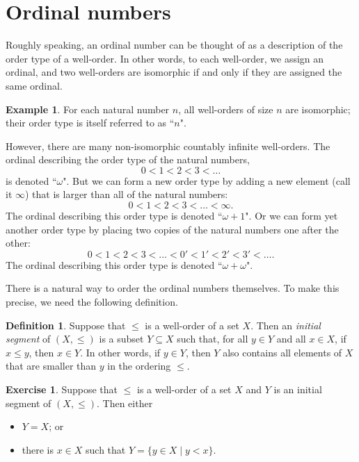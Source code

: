 \documentclass[a4paper]{memoir}
\theoremstyle{definition}
\newtheorem{definition}[theorem]{Definition}
\newtheorem{exercise}[theorem]{Exercise}
\newtheorem{example}[theorem]{Example}
\begin{document}
\section{Ordinal numbers}

Roughly speaking, an ordinal number can be thought of as a description of the order type of a well-order. 
In other words, to each well-order, we assign an ordinal, and two well-orders are isomorphic if and only 
if they are assigned the same ordinal. 

\begin{example}
  For each natural number $n$, all well-orders of size $n$ are isomorphic; their order type is itself 
  referred to as ``$n$". 
  
  However, there are many non-isomorphic countably infinite well-orders. The ordinal describing the 
  order type of the natural numbers,
  \[
    0 < 1 < 2 < 3 < \ldots
  \]  
   is denoted ``$\omega$". But we can form a new order type by adding a new element (call it $\infty$) 
   that is larger than all of the natural numbers:
   \[
     0 < 1 < 2 < 3 < \ldots < \infty.
   \]
   The ordinal describing this order type is denoted ``$\omega + 1$". Or we can form yet another order type 
   by placing two copies of the natural numbers one after the other:
   \[
     0 < 1 < 2 < 3 < \ldots < 0' < 1' < 2' < 3' < \ldots.
   \]
   The ordinal describing this order type is denoted ``$\omega + \omega$".
\end{example}

There is a natural way to order the ordinal numbers themselves. To make this precise, we need the 
following definition.

\begin{definition}
  Suppose that $\leq$ is a well-order of a set $X$. Then an \emph{initial segment} of 
  $(X, \leq)$ is a subset $Y \subseteq X$ such that, for all $y \in Y$ and all $x \in X$, 
  if $x \leq y$, then $x \in Y$. In other words, if $y \in Y$, then $Y$ also contains all elements 
  of $X$ that are smaller than $y$ in the ordering $\leq$.
\end{definition}

\begin{exercise}
  Suppose that $\leq$ is a well-order of a set $X$ and $Y$ is an initial segment of 
  $(X, \leq)$. Then either
  \begin{itemize}
    \item $Y = X$; or
    \item there is $x \in X$ such that $Y = \{y \in X \mid y < x\}$.
  \end{itemize}
\end{exercise}
\end{document}
